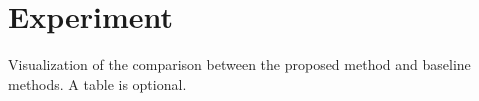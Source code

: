 \section{Experiment}
\label{subsec:experiment}

Visualization of the comparison between the proposed method and baseline methods. A table is optional.